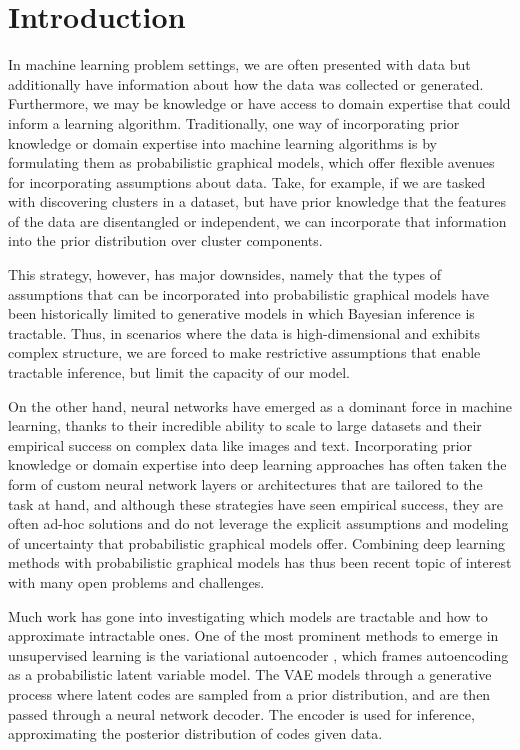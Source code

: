 \chapter{Introduction}

In machine learning problem
settings, we 
are often presented with data
but additionally have
information about how the
data was collected or generated.
Furthermore, we may be 
knowledge or have access
to domain expertise that 
could inform a learning algorithm.
Traditionally,
one way of incorporating
prior knowledge or domain
expertise into machine
learning algorithms
is by formulating them as probabilistic
graphical models, which
offer flexible avenues for
incorporating assumptions about data.
Take, for example, if we are
tasked with discovering
clusters in a dataset, but have
prior knowledge that
the features of the data are
disentangled or independent,
we can incorporate that
information into the
prior distribution
over cluster components.

This strategy, however,
has major downsides,
namely that the types
of assumptions that
can be incorporated
into probabilistic graphical
models have been historically
limited to generative models in which
Bayesian inference is tractable.
Thus, in scenarios where
the data is high-dimensional
and exhibits complex structure,
we are forced to make
restrictive assumptions
that enable tractable inference,
but limit the capacity
of our model.

On the other hand,
neural networks have emerged
as a dominant force
in machine learning,
thanks to their
incredible
ability to scale to large datasets
and their empirical success on complex
data like images and text.
Incorporating prior knowledge
or domain expertise into
deep learning approaches
has often taken the form of
custom neural network layers or
architectures that are tailored
to the task at hand,
and although these strategies
have seen empirical success,
they are often ad-hoc
solutions and do not
leverage the explicit assumptions
and modeling of uncertainty that
probabilistic graphical models offer.
Combining deep learning
methods with probabilistic graphical
models has thus been
recent topic of interest
with many open problems
and challenges.

Much work has gone into investigating
which models are tractable
and how to approximate
intractable ones.
One of the most prominent
methods to emerge in unsupervised learning
is the variational autoencoder \citep[VAE; ][]{Kingma2014, Rezende2014},
which frames autoencoding
as a probabilistic latent variable model.
The VAE models
through a generative process
where latent codes are sampled
from a prior distribution,
and are then passed through a
neural network decoder. 
The encoder is used for inference,
approximating the posterior
distribution of codes given data.

